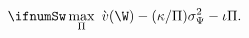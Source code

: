 \begin{eqnarray}
\ifnumSw  \max_{\Pi} ~ \grave{v}(\W)-(\kappa/\Pi)\sigma^{2}_{\Psi}-\iota\Pi. \label{eq:pickPi}
\end{eqnarray}
